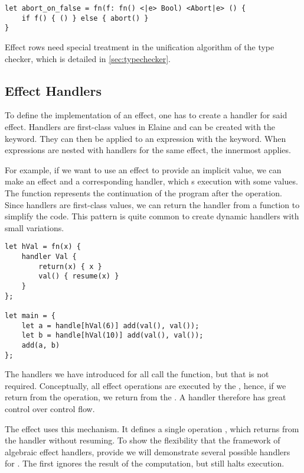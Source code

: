 \begin{lstlisting}[language=elaine, style=fancy]
let abort_on_false = fn(f: fn() <|e> Bool) <Abort|e> () {
    if f() { () } else { abort() }
}
\end{lstlisting}

Effect rows need special treatment in the unification algorithm of the type checker, which is detailed in \cref{sec:typechecker}.

\subsection{Effect Handlers}\label{sec:alghandlers}

To define the implementation of an effect, one has to create a handler for said effect. Handlers are first-class values in Elaine and can be created with the  keyword. They can then be applied to an expression with the  keyword. When  expressions are nested with handlers for the same effect, the innermost  applies.

For example, if we want to use an effect to provide an implicit value, we can make an effect  and a corresponding handler, which s execution with some values. The  function represents the continuation of the program after the operation. Since handlers are first-class values, we can return the handler from a function to simplify the code. This pattern is quite common to create dynamic handlers with small variations.

\begin{lstlisting}[language=elaine, style=fancy]
let hVal = fn(x) {
    handler Val {
        return(x) { x }
        val() { resume(x) }
    }
};

let main = {
    let a = handle[hVal(6)] add(val(), val());
    let b = handle[hVal(10)] add(val(), val());
    add(a, b)
};
\end{lstlisting}

The handlers we have introduced for  all call the  function, but that is not required. Conceptually, all effect operations are executed by the , hence, if we return from the operation, we return from the . A handler therefore has great control over control flow.

The  effect uses this mechanism. It defines a single operation , which returns from the handler without resuming. To show the flexibility that the framework of algebraic effect handlers, provide we will demonstrate several possible handlers for . The first ignores the result of the computation, but still halts execution.


